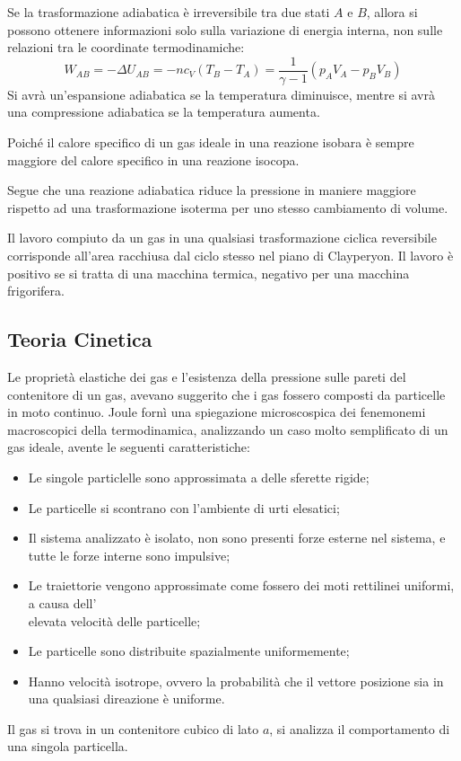 \documentclass{article}
\numberwithin{equation}{subsection}
\begin{document}
Se la trasformazione adiabatica è irreversibile tra due stati $A$ e $B$, allora si possono ottenere informazioni solo sulla variazione di energia interna, non sulle 
relazioni tra le coordinate termodinamiche:
\begin{equation*}
    W_{AB}=-\Delta U_{AB}=-nc_V(T_B-T_A)=\displaystyle\frac{1}{\gamma-1}(p_AV_A-p_BV_B)
\end{equation*}
Si avrà un'espansione adiabatica se la temperatura diminuisce, mentre si avrà una compressione adiabatica se la temperatura aumenta. 


Poiché il calore 
specifico di un gas ideale in una reazione isobara è sempre 
maggiore del calore specifico in una reazione isocopa. 


Segue che 
una reazione adiabatica riduce la pressione in maniere maggiore 
rispetto ad una trasformazione isoterma per uno stesso 
cambiamento di volume.


Il lavoro compiuto da un gas in una qualsiasi trasformazione ciclica reversibile corrisponde all'area racchiusa dal ciclo stesso nel piano di Clayperyon. Il lavoro è positivo 
se si tratta di una macchina termica, negativo per una macchina frigorifera. 

\subsection{Teoria Cinetica}


Le proprietà elastiche dei gas e l'esistenza della pressione sulle pareti del contenitore di un gas, avevano suggerito che i gas fossero composti da particelle in moto 
continuo. Joule fornì una spiegazione microscospica 
dei fenemonemi macroscopici della termodinamica, analizzando 
un caso molto semplificato di un gas ideale, avente le seguenti 
caratteristiche:
\begin{itemize}
    \item Le singole particlelle sono approssimata a delle sferette rigide;
    \item Le particelle si scontrano con l'ambiente di urti elesatici;
    \item Il sistema analizzato è isolato, non sono presenti forze 
    esterne nel sistema, e tutte le forze interne sono impulsive;
    \item Le traiettorie vengono approssimate come fossero dei 
    moti rettilinei uniformi, a causa dell'\\elevata velocità 
    delle particelle;
    \item Le particelle sono distribuite spazialmente uniformemente;
    \item Hanno velocità isotrope, ovvero la probabilità che 
    il vettore posizione sia in una qualsiasi direazione è uniforme. 
\end{itemize}
Il gas si trova in un contenitore cubico di lato $a$, 
si analizza il comportamento di una singola particella.
\end{document}
